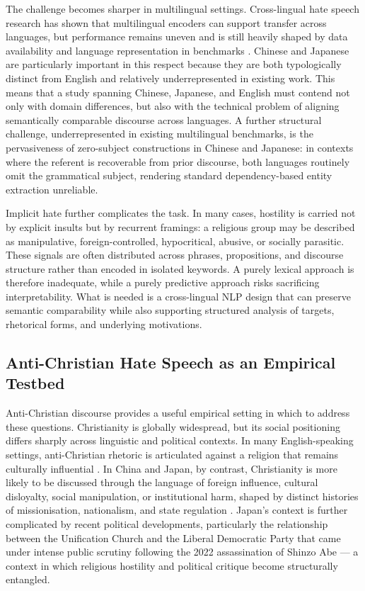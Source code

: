 \documentclass[../CLthesis.tex]{subfiles}
\begin{document}
The challenge becomes sharper in multilingual settings. Cross-lingual hate speech research has shown that multilingual encoders can support transfer across languages, but performance remains uneven and is still heavily shaped by data availability and language representation in benchmarks \citep{corazza_multilingual_2020, joshi2020state}. Chinese and Japanese are particularly important in this respect because they are both typologically distinct from English and relatively underrepresented in existing work. This means that a study spanning Chinese, Japanese, and English must contend not only with domain differences, but also with the technical problem of aligning semantically comparable discourse across languages. A further structural challenge, underrepresented in existing multilingual benchmarks, is the pervasiveness of zero-subject constructions in Chinese and Japanese: in contexts where the referent is recoverable from prior discourse, both languages routinely omit the grammatical subject, rendering standard dependency-based entity extraction unreliable.

Implicit hate further complicates the task. In many cases, hostility is carried not by explicit insults but by recurrent framings: a religious group may be described as manipulative, foreign-controlled, hypocritical, abusive, or socially parasitic. These signals are often distributed across phrases, propositions, and discourse structure rather than encoded in isolated keywords. A purely lexical approach is therefore inadequate, while a purely predictive approach risks sacrificing interpretability. What is needed is a cross-lingual NLP design that can preserve semantic comparability while also supporting structured analysis of targets, rhetorical forms, and underlying motivations.

\subsection{Anti-Christian Hate Speech as an Empirical Testbed}

Anti-Christian discourse provides a useful empirical setting in which to address these questions. Christianity is globally widespread, but its social positioning differs sharply across linguistic and political contexts. In many English-speaking settings, anti-Christian rhetoric is articulated against a religion that remains culturally influential \citep{Yancey2014, scheitle2020}. In China and Japan, by contrast, Christianity is more likely to be discussed through the language of foreign influence, cultural disloyalty, social manipulation, or institutional harm, shaped by distinct histories of missionisation, nationalism, and state regulation \citep{yang2011religion, dunch_beyond_2002, mullins1998christianity, mullins2021religion}. Japan's context is further complicated by recent political developments, particularly the relationship between the Unification Church and the Liberal Democratic Party that came under intense public scrutiny following the 2022 assassination of Shinzo Abe --- a context in which religious hostility and political critique become structurally entangled.
\end{document}
